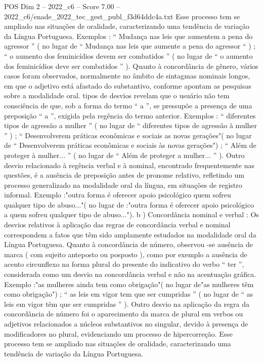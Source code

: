 \begin{textsample}{POS Dim 2 – 2022\_c6 – Score 7.00 – 2022\_c6/enade\_2022\_tec\_gest\_publ\_f3d64ddc4a.txt}
Esse processo tem se ampliado nas situações de oralidade, caracterizando uma tendência de variação da Língua Portuguesa.
Exemplos : “ Mudança nas leis que aumentem a pena do agressor ” ( no lugar de “ Mudança nas leis que aumente a pena do agressor “ ) ; “ o aumento dos feminicídios devem ser combatidos ” ( no lugar de “ o aumento dos feminicídios deve ser combatidos ” ).
Quanto à concordância de gênero, vários casos foram observados, normalmente no âmbito de sintagmas nominais longos, em que o adjetivo está afastado do substantivo, conforme apontam as pesquisas sobre a modalidade oral. tipos de desvios revelam que o usuário não tem consciência de que, sob a forma do termo “ a ”, se pressupõe a presença de uma preposição “ a ”, exigida pela regência do termo anterior.
Exemplos : “ diferentes tipos de agressão a mulher ” ( no lugar de “ diferentes tipos de agressão à mulher ” ) ; “ Desenvolverem práticas econômicas e sociais as novas gerações"( no lugar de “ Desenvolverem práticas econômicas e sociais às novas gerações") ; “ Além de proteger à mulher... ” ( no lugar de “ Além de proteger a mulher... ” ).
Outro desvio relacionado à regência verbal e à nominal, encontrado frequentemente nas questões, é a ausência de preposição antes de pronome relativo, refletindo um processo generalizado na modalidade oral da língua, em situações de registro informal.
Exemplo :"outra forma é oferecer apoio psicológico quem sofreu qualquer tipo de abuso..."( no lugar de :"outra forma é oferecer apoio psicológico a quem sofreu qualquer tipo de abuso..."). b ) Concordância nominal e verbal : Os desvios relativos à aplicação das regras de concordância verbal e nominal correspondem a fatos que têm sido amplamente estudados na modalidade oral da Língua Portuguesa.
Quanto à concordância de número, observou -se ausência de marca ( com sujeito anteposto ou posposto ), como por exemplo a ausência de acento circunflexo na forma plural do presente do indicativo do verbo “ ter ”, considerada como um desvio na concordância verbal e não na acentuação gráfica.
Exemplo :"as mulheres ainda tem como obrigação"( no lugar de"as mulheres têm como obrigação") ; “ as leis em vigor tem que ser cumpridas ” ( no lugar de “ as leis em vigor têm que ser cumpridas ” ).
Outro desvio na aplicação da regra da concordância de número foi o aparecimento da marca de plural em verbos ou adjetivos relacionados a núcleos substantivos no singular, devido à presença de modificadores no plural, evidenciando um processo de hipercorreção.
Esse processo tem se ampliado nas situações de oralidade, caracterizando uma tendência de variação da Língua Portuguesa.

\end{textsample}

